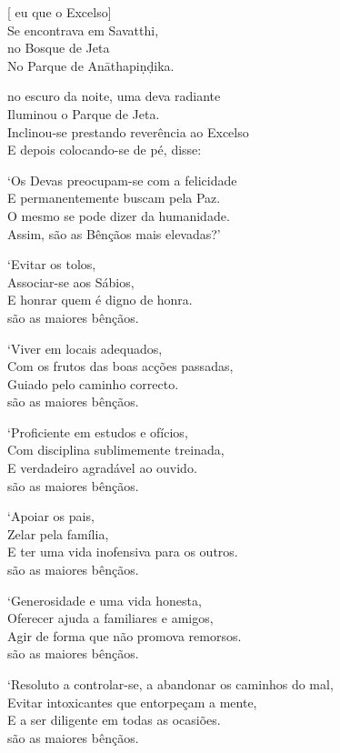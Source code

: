 [ eu  que o Excelso]\\
Se encontrava em Savatthi,\\
 no Bosque de Jeta\\
No Parque de Anāthapiṇḍika.

 no escuro da noite, uma deva radiante\\
Iluminou  o Parque de Jeta.\\
Inclinou-se prestando reverência ao Excelso\\
E depois colocando-se de pé, disse:

`Os Devas preocupam-se com a felicidade\\
E permanentemente buscam pela Paz.\\
O mesmo se pode dizer da humanidade.\\
Assim,  são as Bênçãos mais elevadas?'

`Evitar os tolos,\\
Associar-se aos Sábios,\\
E honrar quem é digno de honra.\\
 são as maiores bênçãos.

`Viver em locais adequados,\\
Com os frutos das boas acções passadas,\\
Guiado pelo caminho correcto.\\
 são as maiores bênçãos.

\clearpage

`Proficiente em estudos e ofícios,\\
Com disciplina sublimemente treinada,\\
E  verdadeiro agradável ao ouvido.\\
 são as maiores bênçãos.

`Apoiar os pais,\\
Zelar pela família,\\
E ter uma vida inofensiva para os outros.\\
 são as maiores bênçãos.

`Generosidade e uma vida honesta,\\
Oferecer ajuda a familiares e amigos,\\
Agir de forma que não promova remorsos.\\
 são as maiores bênçãos.

`Resoluto a controlar-se, a abandonar os caminhos do mal,\\
Evitar intoxicantes que entorpeçam a mente,\\
E a ser diligente em todas as ocasiões.\\
 são as maiores bênçãos.

